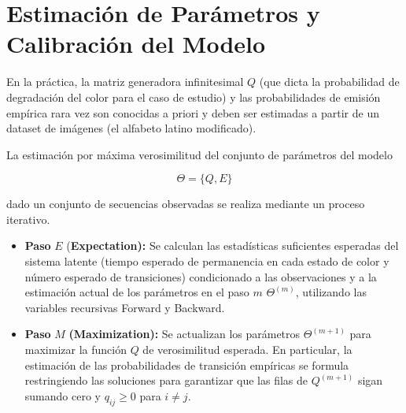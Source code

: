 \documentclass[
  spanish,
  us-letterpaper,
  DIV=11,
  numbers=noendperiod]{scrreprt}
\newcounter{quartocalloutnteno}
\newcommand{\quartocalloutnte}[1]{\refstepcounter{quartocalloutnteno}\label{#1}}
\begin{document}

\chapter{Estimación de Parámetros y Calibración del
Modelo}\label{estimaciuxf3n-de-paruxe1metros-y-calibraciuxf3n-del-modelo}

En la práctica, la matriz generadora infinitesimal \(Q\) (que dicta la
probabilidad de degradación del color para el caso de estudio) y las
probabilidades de emisión empírica rara vez son conocidas a priori y
deben ser estimadas a partir de un dataset de imágenes (el alfabeto
latino modificado).

\begin{tcolorbox}[enhanced jigsaw, coltitle=black, arc=.35mm, toptitle=1mm, bottomrule=.15mm, rightrule=.15mm, toprule=.15mm, colframe=quarto-callout-important-color-frame, colback=white, bottomtitle=1mm, title=\textcolor{quarto-callout-important-color}{\faExclamation}\hspace{0.5em}{Importante \ref*{nte-baum-welch}: Propiedad (Algoritmo de Expectation-Maximization (Baum-Welch))}, titlerule=0mm, leftrule=.75mm, left=2mm, opacitybacktitle=0.6, opacityback=0, colbacktitle=quarto-callout-important-color!10!white, breakable]

\quartocalloutnte{nte-baum-welch} 

La estimación por máxima verosimilitud del conjunto de parámetros del
modelo

\[
\Theta=\{Q,E\}
\]

dado un conjunto de secuencias observadas se realiza mediante un proceso
iterativo.

\begin{itemize}
\item
  \textbf{Paso} \(E\) (\textbf{Expectation):} Se calculan las
  estadísticas suficientes esperadas del sistema latente (tiempo
  esperado de permanencia en cada estado de color y número esperado de
  transiciones) condicionado a las observaciones y a la estimación
  actual de los parámetros en el paso \(m\) \(\Theta^{(m)}\), utilizando
  las variables recursivas Forward y Backward.
\item
  \textbf{Paso} \(M\) \textbf{(Maximization):} Se actualizan los
  parámetros \(\Theta^{(m+1)}\) para maximizar la función \(Q\) de
  verosimilitud esperada. En particular, la estimación de las
  probabilidades de transición empíricas se formula restringiendo las
  soluciones para garantizar que las filas de \(Q^{(m+1)}\) sigan
  sumando cero y \(q_{ij}\ge0\) para \(i\neq j\).
\end{itemize}

\end{tcolorbox}
\end{document}

